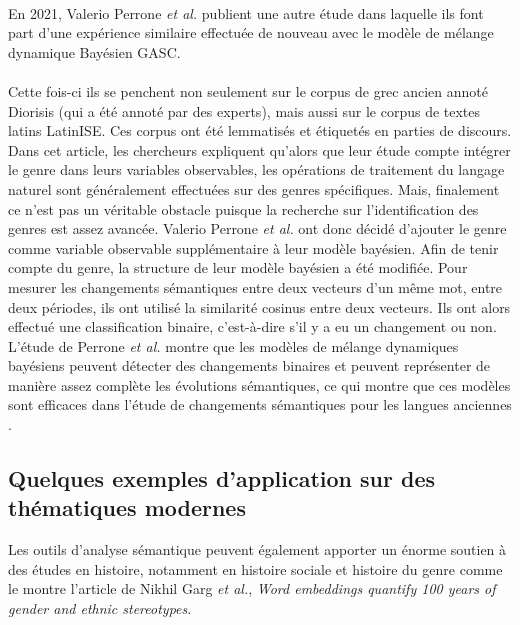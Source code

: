 \documentclass{article}
\begin{document}
\paragraph{}
En 2021, Valerio Perrone \textit{et al.} publient une autre étude \cite{perrone2021lexical} dans laquelle ils font part d’une expérience similaire effectuée de nouveau avec le modèle de mélange dynamique Bayésien GASC. 
\paragraph{}
Cette fois-ci ils se penchent non seulement sur le corpus de grec ancien annoté Diorisis (qui a été annoté par des experts), mais aussi sur le corpus de textes latins LatinISE. Ces corpus ont été lemmatisés et étiquetés en parties de discours. Dans cet article, les chercheurs expliquent qu’alors que leur étude compte intégrer le genre dans leurs variables observables, les opérations de traitement du langage naturel sont généralement effectuées sur des genres spécifiques. Mais, finalement ce n’est pas un véritable obstacle puisque la recherche sur l’identification des genres est assez avancée. Valerio Perrone \textit{et al.} ont donc décidé d’ajouter le genre comme variable observable supplémentaire à leur modèle bayésien. Afin de tenir compte du genre, la structure de leur modèle bayésien a été modifiée. Pour mesurer les changements sémantiques entre deux vecteurs d’un même mot, entre deux périodes, ils ont utilisé la similarité cosinus entre deux vecteurs. Ils ont alors effectué une classification binaire, c’est-à-dire s’il y a eu un changement ou non. L’étude de Perrone \textit{et al.} montre que les modèles de mélange dynamiques bayésiens peuvent détecter des changements binaires et peuvent représenter de manière assez complète les évolutions sémantiques, ce qui montre que ces modèles sont efficaces dans l’étude de changements sémantiques pour les langues anciennes \cite{perrone2021lexical}.

\subsection{Quelques exemples d'application sur des thématiques modernes}
Les outils d’analyse sémantique peuvent également apporter un énorme soutien à des études en histoire, notamment en histoire sociale et histoire du genre comme le montre l’article de Nikhil Garg \textit{et al.}, \textit{Word embeddings quantify 100 years of gender and ethnic stereotypes}. 
\end{document}
